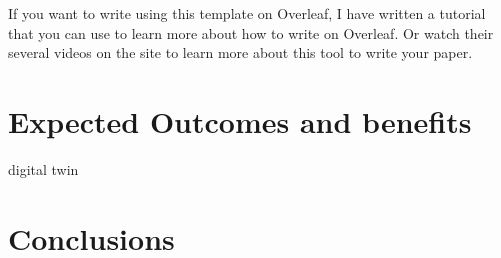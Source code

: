 \documentclass[a4paper]{article}
\begin{document}
If you want to write using this template on Overleaf, I have written a tutorial that you can use to learn more about how to write on Overleaf. Or watch their several videos on the site to learn more about this tool to write your paper. 


\section*{Expected Outcomes and benefits}


digital twin


%

\section*{Conclusions}


\printbibliography
\end{document}
